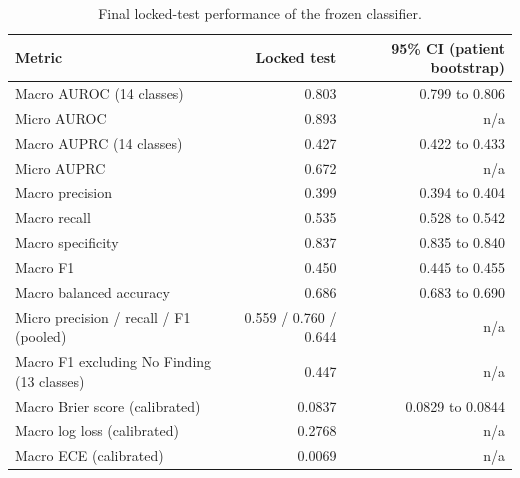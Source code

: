 \begin{table}[t]
\centering
\scriptsize
\begin{tabular}{lrr}
\hline
Metric & Locked test & 95\% CI (patient bootstrap) \\
\hline
Macro AUROC (14 classes) & 0.803 & 0.799 to 0.806 \\
Micro AUROC & 0.893 & n/a \\
Macro AUPRC (14 classes) & 0.427 & 0.422 to 0.433 \\
Micro AUPRC & 0.672 & n/a \\
Macro precision & 0.399 & 0.394 to 0.404 \\
Macro recall & 0.535 & 0.528 to 0.542 \\
Macro specificity & 0.837 & 0.835 to 0.840 \\
Macro F1 & 0.450 & 0.445 to 0.455 \\
Macro balanced accuracy & 0.686 & 0.683 to 0.690 \\
Micro precision / recall / F1 (pooled) & 0.559 / 0.760 / 0.644 & n/a \\
Macro F1 excluding No Finding (13 classes) & 0.447 & n/a \\
Macro Brier score (calibrated) & 0.0837 & 0.0829 to 0.0844 \\
Macro log loss (calibrated) & 0.2768 & n/a \\
Macro ECE (calibrated) & 0.0069 & n/a \\
\hline
\end{tabular}
\caption{Final locked-test performance of the frozen classifier.}
\label{tab:table1_final_overall_performance}
\end{table}
